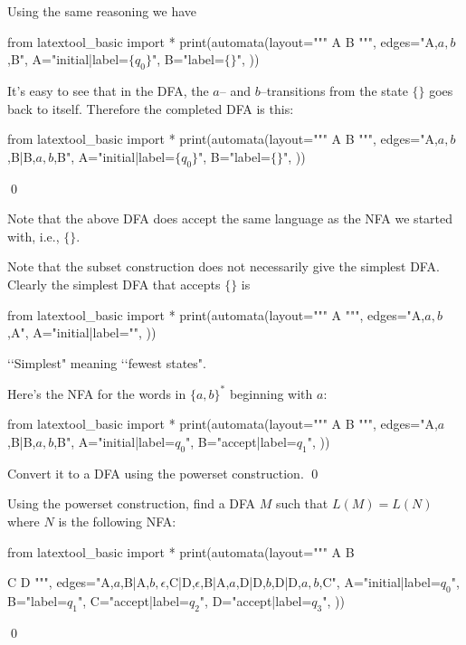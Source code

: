 Using the same reasoning we have

\begin{python}
from latextool_basic import *
print(automata(layout="""
A  B
""",
edges="A,$a,b$,B",
A="initial|label=$\{q_0\}$",
B="label=$\{\}$",
))
\end{python}

It's easy to see that in the DFA, the $a$--
and $b$--transitions from the state $\{\}$ goes back to itself.
Therefore the completed DFA is this:


\begin{python}
from latextool_basic import *
print(automata(layout="""
A  B
""",
edges="A,$a,b$,B|B,$a,b$,B",
A="initial|label=$\{q_0\}$",
B="label=$\{\}$",
))
\end{python}
\qed


Note that the above DFA does accept the same language as the 
NFA we started with, i.e., $\{\}$.

Note that the subset construction does not
necessarily give the simplest DFA.
Clearly the simplest DFA that accepts $\{\}$ is
\begin{python}
from latextool_basic import *
print(automata(layout="""
A  
""",
edges="A,$a,b$,A",
A="initial|label="",
))
\end{python}
\lq\lq Simplest" meaning \lq\lq fewest states".



\newpage
\begin{ex}
Here's the NFA for the words in $\{a, b\}^*$ beginning with $a$: 

\begin{python}
from latextool_basic import *
print(automata(layout="""
A B
""",
edges="A,$a$,B|B,$a,b$,B",
A="initial|label=$q_0$",
B="accept|label=$q_1$",
))
\end{python}

Convert it to a DFA using the powerset construction.
\qed
\end{ex}
\vspace{3in}



\newpage
\begin{ex}
Using the powerset construction, find a DFA $M$ such that
$L(M) = L(N)$ where $N$ is the following NFA:

\begin{python}
from latextool_basic import *
print(automata(layout="""
A         B

C    D
""",
edges="A,$a$,B|A,$b,\epsilon$,C|D,$\epsilon$,B|A,$a$,D|D,$b$,D|D,$a,b$,C",
A="initial|label=$q_0$",
B="label=$q_1$",
C="accept|label=$q_2$",
D="accept|label=$q_3$",
))
\end{python}
\qed
\end{ex}


